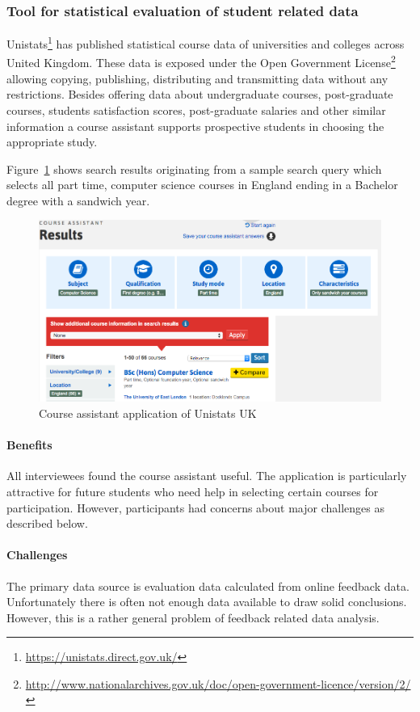 \documentclass{article}
\begin{document}
\subsubsection{Tool for statistical evaluation of student related data}
Unistats\footnote{\url{https://unistats.direct.gov.uk/}} has published statistical course data of universities and colleges across United Kingdom. These data is exposed under the Open Government License\footnote{\url{http://www.nationalarchives.gov.uk/doc/open-government-licence/version/2/}} allowing copying, publishing, distributing and transmitting data without any restrictions. Besides offering data about undergraduate courses, post-graduate courses, students satisfaction scores, post-graduate salaries and other similar information a course assistant supports prospective students in choosing the appropriate study. 

Figure~\ref{fig:unistats-uk} shows search results originating from a sample search query which selects all part time, computer science courses in England ending in a Bachelor degree with a sandwich year. 
\begin{figure}[H]
	\centering \includegraphics*[width=.8\columnwidth]{unistats_uk.png}
	\caption{Course assistant application of Unistats UK}
	\label{fig:unistats-uk}
\end{figure}

\paragraph{Benefits}
All interviewees found the course assistant useful. The application is particularly attractive for future students who need help in selecting certain courses for participation. However, participants had concerns about major challenges as described below.  
\paragraph{Challenges}
The primary data source is evaluation data calculated from online feedback data. Unfortunately there is often not enough data available to draw solid conclusions. However, this is a rather general problem of feedback related data analysis. 
\end{document}
